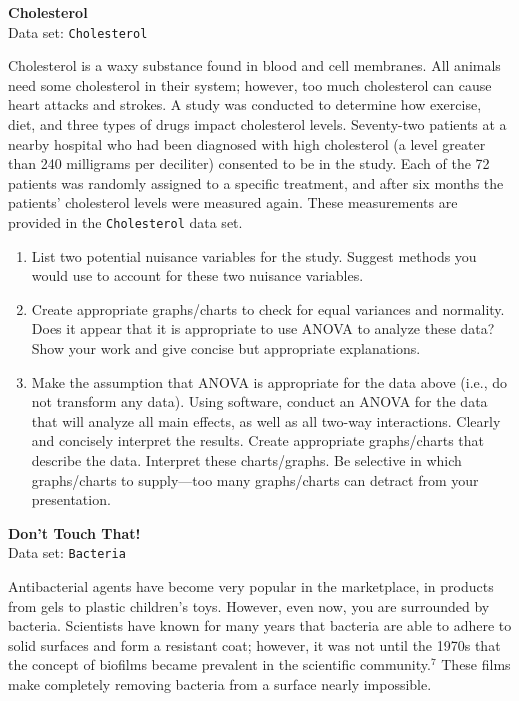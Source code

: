 \documentclass[
]{report}
\begin{document}
\begin{list}{E.}{ \setlength{\itemsep}{1.2em}}
  \item \textbf{Cholesterol}\\
  Data set: \texttt{Cholesterol}
  
Cholesterol is a waxy substance found in blood and cell membranes. All animals need some cholesterol in their system; however, too much cholesterol can cause heart attacks and strokes. A study was conducted to determine how exercise, diet, and three types of drugs impact cholesterol levels. Seventy-two patients at a nearby hospital who had been diagnosed with high cholesterol (a level greater than 240 milligrams per deciliter) consented to be in the study. Each of the 72 patients was randomly assigned to a specific treatment, and after six months the patients’ cholesterol levels were measured again. These measurements are provided in the \texttt{Cholesterol} data set.

  \begin{enumerate}
    \item List two potential nuisance variables for the study. Suggest methods you would use to account for these two nuisance variables.
    \item Create appropriate graphs/charts to check for equal variances and normality. Does it appear that it is appropriate to use ANOVA to analyze these data? Show your work and give concise but appropriate explanations.
    \item Make the assumption that ANOVA is appropriate for the data above (i.e., do not transform any data). Using software, conduct an ANOVA for the data that will analyze all main effects, as well as all two-way interactions. Clearly and concisely interpret the results. Create appropriate graphs/charts that describe the data. Interpret these charts/graphs. Be selective in which graphs/charts to supply---too many graphs/charts can detract from your presentation.
  \end{enumerate}

  \item \textbf{Don't Touch That!}\\
  Data set: \texttt{Bacteria}

Antibacterial agents have become very popular in the marketplace, in products from gels to plastic children’s toys. However, even now, you are surrounded by bacteria. Scientists have known for many years that bacteria are able to adhere to solid surfaces and form a resistant coat; however, it was not until the 1970s that the concept of biofilms became prevalent in the scientific community.$^7$ These films make completely removing bacteria from a surface nearly impossible.


\end{list}
\end{document}
